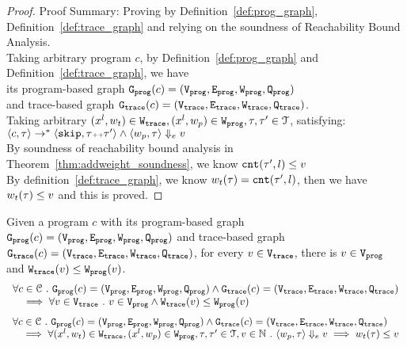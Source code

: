 \begin{proof}
Proof Summary: Proving by Definition~\ref{def:prog_graph}, Definition~\ref{def:trace_graph} and relying on the soundness of Reachability Bound 
Analysis.
\\
Taking arbitrary program $c$,
by Definition~\ref{def:prog_graph} and Definition~\ref{def:trace_graph}, 
we have   
\\
its program-based graph $\mathtt{{G_{prog}}}({c}) = (\mathtt{{V_{prog}}}, \mathtt{{E_{prog}}}, \mathtt{{W_{prog}}}, \mathtt{{Q_{prog}}})$ 
\\
and 
trace-based graph $\mathtt{{G_{trace}}}({c}) = (\mathtt{{V_{trace}}}, \mathtt{{E_{trace}}}, \mathtt{{W_{trace}}}, \mathtt{{Q_{trace}}})$.
\\
Taking arbitrary 
$(x^l, w_{t}) \in \mathtt{{W_{trace}}}, (x^l, w_{p}) \in \mathtt{{W_{prog}}}, \mathtt{\tau}, \mathtt{\tau}' \in \mathcal{T}$, satisfying:
\\
$\langle {c}, \mathtt{\tau} \rangle \to^{*} \langle \mathtt{skip}, \mathtt{\tau}{\scriptscriptstyle ++}\mathtt{\tau}' \rangle 
\land 
\langle w_{p}, \mathtt{\tau} \rangle \Downarrow_e v$
\\
By soundness of reachability bound analysis in Theorem~\ref{thm:addweight_soundness}, we know 
$\mathtt{cnt}(\mathtt{\tau}', l) \leq v$
\\
By definition~\ref{def:trace_graph}, we know $w_t(\mathtt{\tau}) = \mathtt{cnt}(\mathtt{\tau}', l)$,
then we have $w_t(\mathtt{\tau}) \leq v$ and this is proved.
\end{proof}
%
\begin{lem}
	\label{lem:edgeweights_map}
	Given a program $c$ with its
	program-based graph $\mathtt{{G_{prog}}}({c}) = (\mathtt{{V_{prog}}}, \mathtt{{E_{prog}}}, \mathtt{{W_{prog}}}, \mathtt{{Q_{prog}}})$
	and 
	trace-based graph $\mathtt{{G_{trace}}}({c}) = (\mathtt{{V_{trace}}}, \mathtt{{E_{trace}}}, \mathtt{{W_{trace}}}, \mathtt{{Q_{trace}}})$,
	for every $v \in \mathtt{{V_{trace}}}$, there is $v \in \mathtt{{V_{prog}}}$ and $\mathtt{{W_{trace}}}(v) \leq \mathtt{{W_{prog}}}(v)$.
%
%
\[
	\begin{array}{l}
	\forall c \in \mathcal{C} 
	 ~.~ 
	 \mathtt{{G_{prog}}}({c}) = (\mathtt{{V_{prog}}}, \mathtt{{E_{prog}}}, \mathtt{{W_{prog}}}, \mathtt{{Q_{prog}}})
	\land 
	\mathtt{{G_{trace}}}({c}) = (\mathtt{{V_{trace}}}, \mathtt{{E_{trace}}}, \mathtt{{W_{trace}}}, \mathtt{{Q_{trace}}})
	\\ \quad
	\implies
	\forall v \in \mathtt{{V_{trace}}} ~.~ 
	v \in \mathtt{{V_{prog}}} \land
	\mathtt{{W_{trace}}}(v) \leq \mathtt{{W_{prog}}}(v)
	\end{array}
	\]
	\[
		\begin{array}{l}
			\forall c \in \mathcal{C} 
			 ~.~ 
			 \mathtt{{G_{prog}}}({c}) = (\mathtt{{V_{prog}}}, \mathtt{{E_{prog}}}, \mathtt{{W_{prog}}}, \mathtt{{Q_{prog}}})
			\land 
			\mathtt{{G_{trace}}}({c}) = (\mathtt{{V_{trace}}}, \mathtt{{E_{trace}}}, \mathtt{{W_{trace}}}, \mathtt{{Q_{trace}}})
			\\ \quad
			\implies
			\forall (x^l, w_{t}) \in \mathtt{{W_{trace}}},
			(x^l, w_{p}) \in \mathtt{{W_{prog}}}, \mathtt{\tau}, \mathtt{\tau}' \in \mathcal{T}, v \in \mathbb{N} ~.~
			\langle w_{p}, \mathtt{\tau} \rangle \Downarrow_e v
			\implies
			w_{t}(\mathtt{\tau}) \leq v
		\end{array}
		\]
	\end{lem}
